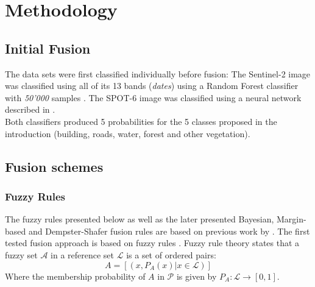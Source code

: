 \documentclass[10pt]{article}
\begin{document}
\section{Methodology}\label{sec:method}
\subsection{Initial Fusion}

The data sets were first classified individually before fusion: The Sentinel-2 image was classified using all of its 13 bands (\textit{dates}) using a Random Forest classifier with \textit{50'000} samples \parencite{puissant_object-oriented_2014}. The SPOT-6 image was classified using a neural network described in \cite{postadjian_investigating_2017}.\\

Both classifiers produced 5 probabilities for the 5 classes proposed in the introduction (building, roads, water, forest and other vegetation).

\subsection{Fusion schemes}\label{sec:fusion}

\subsubsection{Fuzzy Rules}\label{sec:fuzzyLogic}
The fuzzy rules presented below as well as the later presented Bayesian, Margin-based and Dempster-Shafer fusion rules are based on previous work by \cite{ouerghemmi_two-step_2017}. The first tested fusion approach is based on fuzzy rules \cite{zadeh_fuzzy_1965}. Fuzzy rule theory states that a fuzzy set $\mathcal{A}$ in a reference set $\mathcal{L}$ is a set of ordered pairs:
\begin{equation}
    A=[(x,P_A(x)|x\in \mathcal{L})]
\end{equation}
Where the membership probability of $A$ in $\mathcal{P}$ is given by $P_A:\mathcal{L}\rightarrow[0,1]$.
\end{document}
